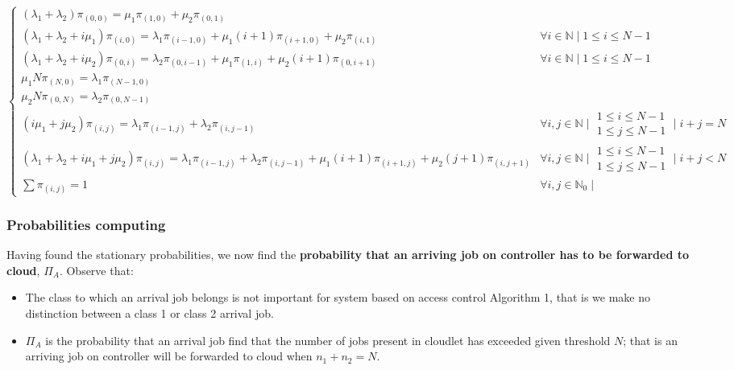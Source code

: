 \documentclass[10pt,a4paper]{article}
\begin{document}
\begin{adjustbox}{center=\textwidth}
\label{equation:AccessControlAlgorithm1-BalanceEquations}

$\begin{cases} 
(\lambda_1 + \lambda_2)\pi_{(0,0)} = \mu_1\pi_{(1,0)} + \mu_2\pi_{(0,1)} \\

(\lambda_1 + \lambda_2 + i\mu_1)\pi_{(i,0)} = \lambda_1\pi_{(i-1,0)} + \mu_1(i+1)\pi_{(i+1,0)} + \mu_2\pi_{(i,1)} & \forall i \in \mathbb{N} \mid 1 \leq i \leq N-1 \\

(\lambda_1 + \lambda_2 + i\mu_2)\pi_{(0,i)} = \lambda_2\pi_{(0,i-1)} + \mu_1\pi_{(1,i)} + \mu_2(i+1)\pi_{(0,i+1)} & \forall i \in \mathbb{N} \mid 1 \leq i \leq N-1 \\

\mu_1N\pi_{(N,0)} = \lambda_1\pi_{(N-1,0)} \\

\mu_2N\pi_{(0,N)} = \lambda_2\pi_{(0,N-1)} \\

(i\mu_1 + j\mu_2)\pi_{(i,j)} = \lambda_1\pi_{(i-1,j)} + \lambda_2\pi_{(i,j-1)} & \forall i,j \in \mathbb{N} \mid \begin{array} {l} 1 \leq i \leq N-1 \\ 1 \leq j \leq N-1 \end{array} \mid i + j = N \\

(\lambda_1 + \lambda_2 + i\mu_1 + j\mu_2)\pi_{(i,j)} = \lambda_1\pi_{(i-1,j)} + \lambda_2\pi_{(i,j-1)} + \mu_1(i+1)\pi_{(i+1,j)} + \mu_2(j+1)\pi_{(i,j+1)} & \forall i,j \in \mathbb{N} \mid \begin{array} {l} 1 \leq i \leq N-1 \\ 1 \leq j \leq N-1 \end{array} \mid i + j < N \\

\sum \pi_{(i,j)} = 1 & \forall i,j \in \mathbb{N}_0 \mid 

\end{cases}
$ 
\end{adjustbox}

\newpage
\subsubsection{Probabilities computing}

Having found the stationary probabilities, we now find the \textbf{probability that an arriving job on controller has to be forwarded to cloud}, \textbf{$\Pi_A$}. Observe that:
\begin{itemize}
\item The class to which an arrival job belongs is not important for system based on access control Algorithm 1, that is we make no distinction between a class 1 or class 2 arrival job.
\item $\Pi_A$ is the probability that an arrival job find that the number of jobs present in cloudlet has exceeded given threshold $N$; that is an arriving job on controller will be forwarded to cloud when $n_1 + n_2 = N$.
\end{itemize}
\end{document}
